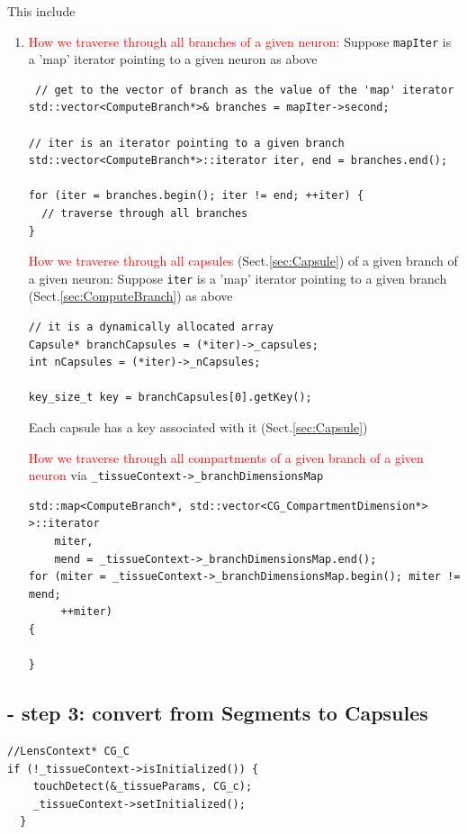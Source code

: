 This include
\begin{enumerate}
  \item 
\textcolor{red}{How we traverse through all branches of a given neuron:} Suppose
\verb!mapIter! is a 'map' iterator pointing to a given neuron as above
\begin{verbatim}
 // get to the vector of branch as the value of the 'map' iterator
std::vector<ComputeBranch*>& branches = mapIter->second;

// iter is an iterator pointing to a given branch
std::vector<ComputeBranch*>::iterator iter, end = branches.end();

for (iter = branches.begin(); iter != end; ++iter) {
  // traverse through all branches
}
\end{verbatim}

\textcolor{red}{How we traverse through all capsules}
(Sect.\ref{sec:Capsule}) of a given branch of a given neuron:
Suppose \verb!iter! is a 'map' iterator pointing to a given branch (Sect.\ref{sec:ComputeBranch}) as above
\begin{verbatim}
// it is a dynamically allocated array
Capsule* branchCapsules = (*iter)->_capsules;
int nCapsules = (*iter)->_nCapsules;

key_size_t key = branchCapsules[0].getKey();
\end{verbatim}
Each capsule has a key associated with it (Sect.\ref{sec:Capsule})


\textcolor{red}{How we traverse through all compartments of a given branch of a
given neuron} via \verb!_tissueContext->_branchDimensionsMap!

\begin{verbatim}
std::map<ComputeBranch*, std::vector<CG_CompartmentDimension*> >::iterator
    miter,
    mend = _tissueContext->_branchDimensionsMap.end();
for (miter = _tissueContext->_branchDimensionsMap.begin(); miter != mend;
     ++miter)
{

}
\end{verbatim}
\end{enumerate}



\subsection{- step 3: convert from Segments to Capsules}
\label{sec:Segment-convert-Capsule}


\begin{verbatim}
//LensContext* CG_C
if (!_tissueContext->isInitialized()) {
    touchDetect(&_tissueParams, CG_c);
    _tissueContext->setInitialized();
  }
\end{verbatim}
 

